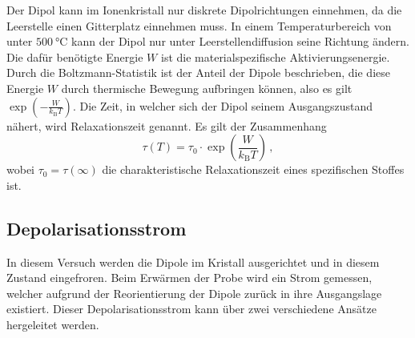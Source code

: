         \noindent Der Dipol kann im Ionenkristall nur diskrete Dipolrichtungen einnehmen, da die Leerstelle einen Gitterplatz einnehmen muss. In einem Temperaturbereich von unter 
        $\SI{500}{\celsius}$ kann der Dipol nur unter Leerstellendiffusion seine Richtung ändern. Die dafür benötigte Energie $W$ ist die materialspezifische Aktivierungsenergie.  
        Durch die Boltzmann-Statistik ist der Anteil der Dipole beschrieben, die diese Energie $W$ durch thermische Bewegung aufbringen können, also es gilt $\exp\left(- \frac{W}{k_\text{B}T}\right)$.
        Die Zeit, in welcher sich der Dipol seinem Ausgangszustand nähert, wird Relaxationszeit genannt. Es gilt der Zusammenhang
        \begin{equation}
            \tau(T) = \tau_0 \cdot \exp \left(\frac{W}{k_\text{B}T}\right)\, ,
            \label{eqn:Relaxationszeit}
        \end{equation}
        wobei $\tau_0 = \tau(\infty)$ die charakteristische Relaxationszeit eines spezifischen Stoffes ist. 


    \subsection{Depolarisationsstrom}

        \noindent In diesem Versuch werden die Dipole im Kristall ausgerichtet und in diesem Zustand eingefroren. Beim Erwärmen der Probe wird ein Strom gemessen, welcher aufgrund der 
        Reorientierung der Dipole zurück in ihre Ausgangslage existiert. Dieser Depolarisationsstrom kann über zwei verschiedene Ansätze hergeleitet werden. \\

